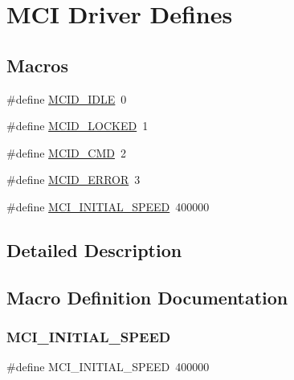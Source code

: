 \hypertarget{group__mcid__defines}{}\section{M\+CI Driver Defines}
\label{group__mcid__defines}
\subsection*{Macros}
\begin{DoxyCompactItemize}
\item 
\#define \mbox{\hyperlink{group__mcid__defines_ga29c7e68de2be32285e3d013042cc3115}{M\+C\+I\+D\+\_\+\+I\+D\+LE}}~0
\item 
\#define \mbox{\hyperlink{group__mcid__defines_ga643375622359916ae33a046c39358ec2}{M\+C\+I\+D\+\_\+\+L\+O\+C\+K\+ED}}~1
\item 
\#define \mbox{\hyperlink{group__mcid__defines_gae74337ed26d19d98b730bbf3f11cc00c}{M\+C\+I\+D\+\_\+\+C\+MD}}~2
\item 
\#define \mbox{\hyperlink{group__mcid__defines_gaa30e68b8ca269164716661df052bd928}{M\+C\+I\+D\+\_\+\+E\+R\+R\+OR}}~3
\item 
\#define \mbox{\hyperlink{group__mcid__defines_gaabec4bd84457d946f08e884d7113d392}{M\+C\+I\+\_\+\+I\+N\+I\+T\+I\+A\+L\+\_\+\+S\+P\+E\+ED}}~400000
\end{DoxyCompactItemize}


\subsection{Detailed Description}


\subsection{Macro Definition Documentation}
\mbox{\label{group__mcid__defines_gaabec4bd84457d946f08e884d7113d392}} 
\subsubsection{\texorpdfstring{MCI\_INITIAL\_SPEED}{MCI\_INITIAL\_SPEED}}
{\footnotesize\ttfamily \#define M\+C\+I\+\_\+\+I\+N\+I\+T\+I\+A\+L\+\_\+\+S\+P\+E\+ED~400000}

